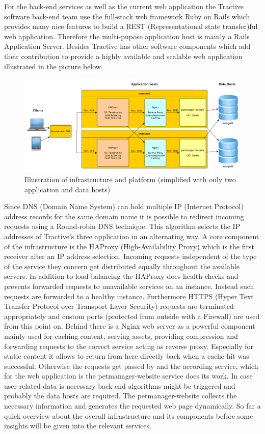 For the back-end services as well as the current web application the Tractive software back-end team use the full-stack web framework Ruby on Rails which provides many nice features to build a REST (Representational state transfer)ful web application. Therefore the multi-pupose application host is mainly a Rails Application Server. Besides Tractive has other software components which add their contribution to provide a highly available and scalable web application illustrated in the picture below. 

\begin{figure}[h]
	\centering
		\includegraphics[width=1.0\textwidth]{imgs/architecture.png}
	\caption{Illustration of infrastructure and platform (simplified with only two application and data hosts)}
\end{figure}

Since DNS (Domain Name System) can hold multiple IP (Internet Protocol) address records for the same domain name it is possible to redirect incoming requests using a Round-robin DNS technique. This algorithm selects the IP addresses of Tractive's three application in an alternating way. A core component of the infrastructure is the HAProxy (High-Availability Proxy) which is the first receiver after an IP address selection. Incoming requests independent of the type of the service they concern get distributed equally throughout the available servers. In addition to load balancing the HAProxy does health checks and prevents forwarded requests to unavailable services on an instance. Instead such requests are forwarded to a healthy instance. Furthermore HTTPS (Hyper Text Transfer Protocol over Transport Layer Security) requests are terminated appropriately and custom ports (protected from outside with a Firewall) are used from this point on. Behind there is a Nginx web server as a powerful component mainly used for caching content, serving assets, providing compression and forwarding requests to the correct service acting as reverse proxy. Especially for static content it allows to return from here directly back when a cache hit was successful. Otherwise the requests get passed by and the according service, which for the web application is the petmanager-website service does its work. In case user-related data is necessary back-end algorithms might be triggered and probably the data hosts are required. The petmanager-website collects the necessary information and generates the requested web page dynamically. 
So far a quick overview about the overall infrastructure and its components before some insights will be given into the relevant services. 

